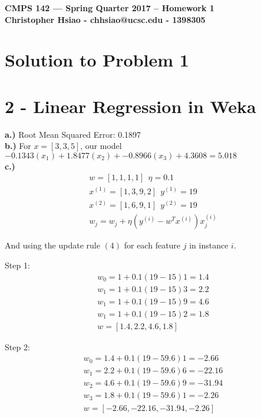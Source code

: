 \documentclass[11pt]{article}
\begin{document}
\begin{center}
{\bf\Large CMPS 142 --- Spring Quarter 2017 --  Homework 1}\\
{\bf Christopher Hsiao - chhsiao@ucsc.edu - 1398305}
\end{center}

\section*{Solution to Problem 1}

\section*{2 - Linear Regression in Weka}
\textbf{a.)} Root Mean Squared Error: 0.1897\\
\textbf{b.)} For $x = [3, 3, 5]$, our model $-0.1343(x_1) + 1.8477(x_2) + -0.8966(x_3) + 4.3608 = 5.018$\\
\textbf{c.)}
\begin{align}
w = [1, 1, 1, 1] \ \ \eta = 0.1 \\ 
x^{(1)} = [1, 3, 9, 2] \ \ y^{(1)} = 19 \\
x^{(2)} = [1, 6, 9, 1] \ \ y^{(2)} = 19 \\
w_j = w_j + \eta(y^{(i)} - w^Tx^{(i)})x^{(i)}_j
\end{align}
\begin{center}
And using the update rule $(4)$ for each feature $j$ in instance $i$.
\end{center}

Step 1: 
\begin{align*}
w_0 = 1 + 0.1(19 - 15)1 = 1.4\\
w_1 = 1 + 0.1(19 - 15)3 = 2.2\\
w_1 = 1 + 0.1(19 - 15)9 = 4.6\\
w_1 = 1 + 0.1(19 - 15)2 = 1.8\\
w = [1.4, 2.2, 4.6, 1.8]
\end{align*}

Step 2:
\begin{align*}
w_0 = 1.4 + 0.1(19 - 59.6)1 = -2.66\\
w_1 = 2.2 + 0.1(19 - 59.6)6 = -22.16\\
w_2 = 4.6 + 0.1(19 - 59.6)9 = -31.94\\
w_3 = 1.8 + 0.1(19 - 59.6)1= -2.26\\
w = [-2.66, -22.16, -31.94, -2.26]
\end{align*}
\end{document}
